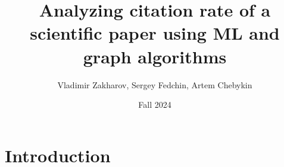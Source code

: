 \documentclass{article}
\title{Analyzing citation rate of a scientific paper using ML and graph algorithms}
\author{Vladimir Zakharov, Sergey Fedchin, Artem Chebykin}
\date{Fall 2024}
\begin{document}
\maketitle

\section{Introduction}
\end{document}
